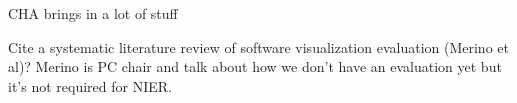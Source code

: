 \label{sec:discussion}

CHA brings in a lot of stuff

Cite a systematic literature review of software visualization evaluation (Merino et al)? Merino is PC chair and talk about how we don't have an evaluation yet but it's not required for NIER.

